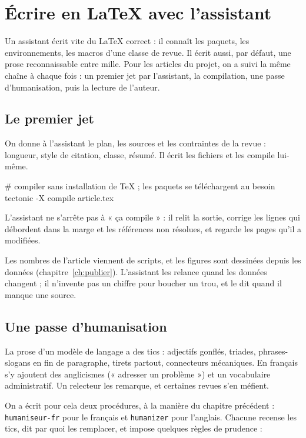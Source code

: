 \chapter{Écrire en LaTeX avec l'assistant}

Un assistant écrit vite du LaTeX correct : il connaît les paquets, les environnements,
les macros d'une classe de revue. Il écrit aussi, par défaut, une prose reconnaissable entre
mille. Pour les articles du projet, on a suivi la même chaîne à chaque fois : un premier jet par
l'assistant, la compilation, une passe d'humanisation, puis la lecture de l'auteur.

\section{Le premier jet}

On donne à l'assistant le plan, les sources et les contraintes de la revue : longueur,
style de citation, classe, résumé. Il écrit les fichiers  et les compile
lui-même.

\begin{terminal}
# compiler sans installation de TeX ; les paquets se téléchargent au besoin
tectonic -X compile article.tex
\end{terminal}

\begin{regle}
L'assistant ne s'arrête pas à « ça compile » : il relit la sortie, corrige les lignes qui
débordent dans la marge et les références non résolues, et regarde les pages qu'il a
modifiées.
\end{regle}

Les nombres de l'article viennent de scripts, et les figures sont dessinées depuis les
données (chapitre~\ref{ch:publier}). L'assistant les relance quand les données changent ;
il n'invente pas un chiffre pour boucher un trou, et le dit quand il manque une source.

\section{Une passe d'humanisation}

La prose d'un modèle de langage a des tics : adjectifs gonflés, triades, phrases-slogans en
fin de paragraphe, tirets partout, connecteurs mécaniques. En français s'y ajoutent des
anglicismes (« adresser un problème ») et un vocabulaire administratif. Un relecteur les
remarque, et certaines revues s'en méfient.

On a écrit pour cela deux procédures, à la manière du chapitre précédent :
\texttt{humaniseur-fr} pour le français et \texttt{humanizer} pour l'anglais. Chacune
recense les tics, dit par quoi les remplacer, et impose quelques règles de prudence :

